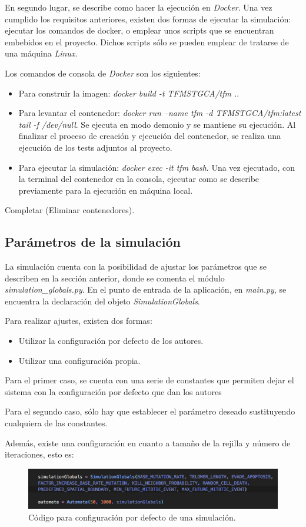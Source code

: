 En segundo lugar, se describe como hacer la ejecución en \textit{Docker}. Una vez cumplido los requisitos anteriores, existen dos
formas de ejecutar la simulación: ejecutar los comandos de docker, o emplear unos scripts que se encuentran embebidos en el proyecto.
Dichos scripts sólo se pueden emplear de tratarse de una máquina \textit{Linux}.

Los comandos de consola de \textit{Docker} son los siguientes:

\begin{itemize}
  \item Para construir la imagen: \textit{docker build -t TFMSTGCA/tfm .}.
  \item Para levantar el contenedor: \textit{docker run --name tfm -d TFMSTGCA/tfm:latest tail -f /dev/null}. Se ejecuta en modo demonio y se mantiene su
  ejecución. Al finalizar el proceso de creación y ejecución del contenedor, se realiza una ejecución de los tests adjuntos al proyecto.
  \item Para ejecutar la simulación: \textit{docker exec -it tfm bash}. Una vez ejecutado, con la terminal del contenedor en la consola, ejecutar como se describe previamente
  para la ejecución en máquina local.
\end{itemize}

Completar (Eliminar contenedores).

\subsection{Parámetros de la simulación}

La simulación cuenta con la posibilidad de ajustar los parámetros que se describen en la sección anterior,
donde se comenta el módulo \textit{simulation\_globals.py}. En el punto de entrada de la aplicación,
en \textit{main.py}, se encuentra la declaración del objeto \textit{SimulationGlobals}.

Para realizar ajustes, existen dos formas:

\begin{itemize}
  \item Utilizar la configuración por defecto de los autores.
  \item Utilizar una configuración propia.
\end{itemize}

Para el primer caso, se cuenta con una serie de constantes que permiten dejar el sistema con la
configuración por defecto que dan los autores

Para el segundo caso, sólo hay que establecer el parámetro deseado sustituyendo cualquiera de las constantes.

Además, existe una configuración en cuanto a tamaño de la rejilla y número de iteraciones, esto es:

\begin{figure}[h]
\centering
\includegraphics[scale=0.6]{figures/simulations_globals}
\caption{Código para configuración por defecto de una simulación.}
\end{figure}
